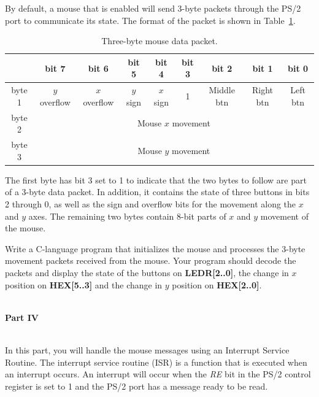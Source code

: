 \documentclass[epsfig,10pt,fullpage]{article}
\begin{document}
By default, a mouse that is enabled will send 3-byte packets through the PS/2 port to communicate its state. The format of the
packet is shown in Table~\ref{tab:mouse_three_byte_packet}.

\begin{table}[h]
	\caption{Three-byte mouse data packet.}
	\begin{center}
		\begin{tabular}{|c|c|c|c|c|c|c|c|c|}
			\hline
			~&
			\textbf{bit 7} &
			\textbf{bit 6} &
			\textbf{bit 5} &
			\textbf{bit 4} &
			\textbf{bit 3} &
			\textbf{bit 2} &
			\textbf{bit 1} &
			\textbf{bit 0}
			\\\hline
			byte 1&
			$y$ overflow &
			$x$ overflow &
			$y$ sign &
			$x$ sign &
			1 &
			Middle btn &
			Right btn &
			Left btn
			\\\hline
			byte 2&
			\multicolumn{8}{|c|}{Mouse $x$ movement}
			\\\hline
			byte 3&
			\multicolumn{8}{|c|}{Mouse $y$ movement}
			\\\hline
		\end{tabular}
	\end{center}
	\label{tab:mouse_three_byte_packet}
\end{table}

\noindent
The first byte has bit 3 set to 1 to indicate that the two bytes to follow are part of a 3-byte data packet. In addition, it contains the state of three buttons in bits 2 through 0, as well as the sign and overflow bits for the movement along the $x$ and $y$ axes. The remaining two bytes contain 8-bit parts of $x$ and $y$ movement of the mouse.

Write a C-language program that initializes the mouse and processes the 3-byte movement packets received from the mouse. Your program should decode the packets and display the state of the buttons on {\bf LEDR[2..0]}, the change in $x$ position on {\bf HEX[5..3]} and the change in $y$ position on {\bf HEX[2..0]}.

~\\
\noindent
{\bf Part IV}

~\\
\noindent
In this part, you will handle the mouse messages using an Interrupt Service Routine. The interrupt service routine (ISR) is a function that is executed when an interrupt occurs. An interrupt will occur when the {\it RE} bit in the PS/2 control register is set to 1 and the PS/2 port has a message ready to be read.
\end{document}
